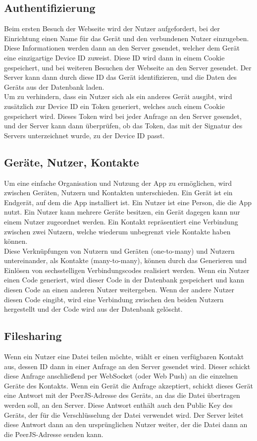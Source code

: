 \documentclass[a4paper]{article}
\begin{document}
\subsection{Authentifizierung}

Beim ersten Besuch der Webseite wird der Nutzer aufgefordert, bei der
Einrichtung einen Name für das Gerät und den verbundenen Nutzer einzugeben.
Diese Informationen werden dann an den Server gesendet, welcher dem Gerät eine
einzigartige Device ID zuweist. Diese ID wird dann in einem Cookie gespeichert,
und bei weiteren Besuchen der Webseite an den Server gesendet. Der Server kann
dann durch diese ID das Gerät identifizieren, und die Daten des Geräts aus der
Datenbank laden.\\
Um zu verhindern, dass ein Nutzer sich als ein anderes Gerät ausgibt, wird
zusätzlich zur Device ID ein Token generiert, welches auch einem Cookie
gespeichert wird. Dieses Token wird bei jeder Anfrage an den Server gesendet,
und der Server kann dann überprüfen, ob das Token, das mit der Signatur des
Servers unterzeichnet wurde, zu der Device ID passt.

\subsection{Geräte, Nutzer, Kontakte}

Um eine einfache Organisation und Nutzung der App zu ermöglichen, wird zwischen
Geräten, Nutzern und Kontakten unterschieden. Ein Gerät ist ein Endgerät, auf
dem die App installiert ist. Ein Nutzer ist eine Person, die die App nutzt. Ein
Nutzer kann mehrere Geräte besitzen, ein Gerät dagegen kann nur einem Nutzer
zugeordnet werden. Ein Kontakt repräsentiert eine Verbindung zwischen zwei
Nutzern, welche wiederum unbegrenzt viele Kontakte haben können.\\
Diese Verknüpfungen von Nutzern und Geräten (one-to-many) und Nutzern
untereinander, als Kontakte (many-to-many), können durch das Generieren und
Einlösen von sechsstelligen Verbindungscodes realisiert werden. Wenn ein Nutzer
einen Code generiert, wird dieser Code in der Datenbank gespeichert und kann
diesen Code an einen anderen Nutzer weitergeben. Wenn der andere Nutzer diesen
Code eingibt, wird eine Verbindung zwischen den beiden Nutzern hergestellt und
der Code wird aus der Datenbank gelöscht.


\subsection{Filesharing}
Wenn ein Nutzer eine Datei teilen möchte, wählt er einen verfügbaren Kontakt
aus, dessen ID dann in einer Anfrage an den Server gesendet wird. Dieser schickt
diese Anfrage anschließend per WebSocket (oder Web Push) an die einzelnen Geräte
des Kontakts. Wenn ein Gerät die Anfrage akzeptiert, schickt dieses Gerät eine
Antwort mit der PeerJS-Adresse des Geräts, an das die Datei übertragen werden
soll, an den Server. Diese Antwort enthält auch den Public Key des Geräts, der
für die Verschlüsselung der Datei verwendet wird. Der Server leitet diese
Antwort dann an den ursprünglichen Nutzer weiter, der die Datei dann an die
PeerJS-Adresse senden kann.
\end{document}
